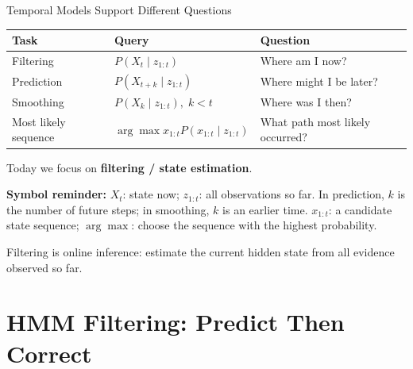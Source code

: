 \documentclass[aspectratio=169,10pt]{beamer}
\newcommand{\equationlegend}[1]{%
  \par\smallskip
  \begingroup
    \setlength{\fboxsep}{5pt}%
    \noindent\colorbox{DeckSoft}{%
      \parbox{\dimexpr\linewidth-2\fboxsep\relax}{%
        \footnotesize\textbf{Symbol reminder:} #1%
      }%
    }\par
  \endgroup
  \smallskip
}
\begin{document}
\begin{frame}[shrink=10]{Temporal Models Support Different Questions}
  \begin{center}
    \renewcommand{\arraystretch}{1.35}
    \begin{tabular}{l|l|l}
      \textbf{Task} & \textbf{Query} & \textbf{Question} \\\hline
      Filtering & $P(X_t\mid z_{1:t})$ & Where am I now? \\
      Prediction & $P(X_{t+k}\mid z_{1:t})$ & Where might I be later? \\
      Smoothing & $P(X_k\mid z_{1:t}),\;k<t$ & Where was I then? \\
      Most likely sequence & $\arg\max x_{1:t}P(x_{1:t}\mid z_{1:t})$ & What path most likely occurred? \\
    \end{tabular}
  \end{center}

  Today we focus on \textbf{filtering / state estimation}.

  \equationlegend{$X_t$: state now; $z_{1:t}$: all observations so far. In prediction, $k$ is the number of future steps; in smoothing, $k$ is an earlier time. $x_{1:t}$: a candidate state sequence; $\arg\max$: choose the sequence with the highest probability.}

  \begin{keyidea}
    Filtering is online inference: estimate the current hidden state from all evidence observed so far.
  \end{keyidea}
\end{frame}

\section{HMM Filtering: Predict Then Correct}
\end{document}

